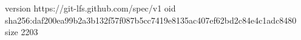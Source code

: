 version https://git-lfs.github.com/spec/v1
oid sha256:daf200ea99b2a3b132f57f087b5cc7419e8135ac407ef62bd2c84e4c1adc8480
size 2203
